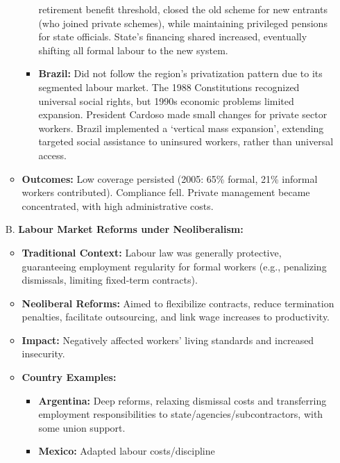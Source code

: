 \documentclass{article}
\begin{document}
\begin{itemize}
\begin{itemize}
\begin{itemize}
                retirement benefit threshold, closed the old scheme for new
                entrants (who joined private schemes), while maintaining
                privileged pensions for state officials. State's financing
                shared increased, eventually shifting all formal labour to
                the new system.
                \item \textbf{Brazil:} Did not follow the region's
                privatization pattern due to its segmented labour market.
                The 1988 Constitutions recognized universal social rights,
                but 1990s economic problems limited expansion. President
                Cardoso made small changes for private sector workers.
                Brazil implemented a `vertical mass expansion', extending
                targeted social assistance to uninsured workers, rather than
                universal access.
            \end{itemize}
            \item \textbf{Outcomes:} Low coverage persisted (2005: 65\%
            formal, 21\% informal workers contributed). Compliance fell.
            Private management became concentrated, with high administrative
            costs.
        \end{itemize}
        \item[B.] \textbf{Labour Market Reforms under Neoliberalism:}
        \begin{itemize}
            \item \textbf{Traditional Context:} Labour law was generally
            protective, guaranteeing employment regularity for formal
            workers (e.g., penalizing dismissals, limiting fixed-term
            contracts).
            \item \textbf{Neoliberal Reforms:} Aimed to flexibilize
            contracts, reduce termination penalties, facilitate outsourcing,
            and link wage increases to productivity.
            \item \textbf{Impact:} Negatively affected workers' living
            standards and increased insecurity.
            \item \textbf{Country Examples:}
            \begin{itemize}
                \item \textbf{Argentina:} Deep reforms, relaxing dismissal
                costs and transferring employment responsibilities to
                state/agencies/subcontractors, with some union support.
                \item \textbf{Mexico:} Adapted labour costs/discipline

\end{itemize}
\end{itemize}
\end{itemize}
\end{document}
